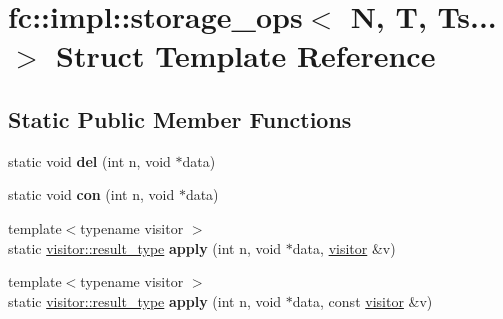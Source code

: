 \hypertarget{structfc_1_1impl_1_1storage__ops_3_01_n_00_01_t_00_01_ts_8_8_8_01_4}{}\section{fc\+:\+:impl\+:\+:storage\+\_\+ops$<$ N, T, Ts... $>$ Struct Template Reference}
\label{structfc_1_1impl_1_1storage__ops_3_01_n_00_01_t_00_01_ts_8_8_8_01_4}
\subsection*{Static Public Member Functions}
\begin{DoxyCompactItemize}
\item 
\mbox{\label{structfc_1_1impl_1_1storage__ops_3_01_n_00_01_t_00_01_ts_8_8_8_01_4_a3678d947160a0856c5266c2c8e7b4521}} 
static void {\bfseries del} (int n, void $\ast$data)
\item 
\mbox{\label{structfc_1_1impl_1_1storage__ops_3_01_n_00_01_t_00_01_ts_8_8_8_01_4_aa69235c08d9078edbb6b517742681067}} 
static void {\bfseries con} (int n, void $\ast$data)
\item 
\mbox{\label{structfc_1_1impl_1_1storage__ops_3_01_n_00_01_t_00_01_ts_8_8_8_01_4_a311ea950b8928c4022587c009fadb8b9}} 
{\footnotesize template$<$typename visitor $>$ }\\static \mbox{\hyperlink{struct_result}{visitor\+::result\+\_\+type}} {\bfseries apply} (int n, void $\ast$data, \mbox{\hyperlink{structfc_1_1visitor}{visitor}} \&v)
\item 
\mbox{\label{structfc_1_1impl_1_1storage__ops_3_01_n_00_01_t_00_01_ts_8_8_8_01_4_abdd5b8ad54adc545df8e9084da66b9f6}} 
{\footnotesize template$<$typename visitor $>$ }\\static \mbox{\hyperlink{struct_result}{visitor\+::result\+\_\+type}} {\bfseries apply} (int n, void $\ast$data, const \mbox{\hyperlink{structfc_1_1visitor}{visitor}} \&v)
\item 
\mbox{\label{structfc_1_1impl_1_1storage__ops_3_01_n_00_01_t_00_01_ts_8_8_8_01_4_ab93e93a5eb7ed1a824c6dadb24fa706c}} 

\end{DoxyCompactItemize}
